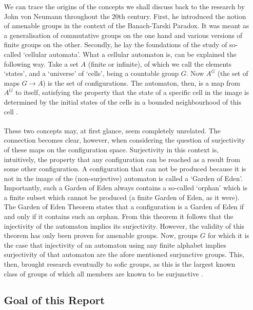 \documentclass[titlepage, a4paper]{article}
\theoremstyle{remark}
\begin{document}
We can trace the origins of the concepts we shall discuss back to the research by John von Neumann throughout the 20th century. First, he introduced the notion of amenable groups in the context of the Banach-Tarski Paradox. It was meant as a generalisation of commutative groups on the one hand and various versions of finite groups on the other. Secondly, he lay the foundations of the study of so-called ‘cellular automata’. What a cellular automaton is, can be explained the following way. Take a set $A$ (finite or infinite), of which we call the elements ‘states’, and a ‘universe’ of ‘cells’, being a countable group $G$. Now $A^G$ (the set of maps $G \to A$) is the set of configurations. The automaton, then, is a map from $A^G$ to itself, satisfying the property that the state of a specific cell in the image is determined by the initial states of the cells in a bounded neighbourhood of this cell \cite{vonNeumann_1966} .\\
\\
These two concepts may, at first glance, seem completely unrelated. The connection becomes clear, however, when considering the question of surjectivity of these maps on the configuration space. Surjectivity in this context is, intuitively, the property that any configuration can be reached as a result from some other configuration. A configuration that can not be produced because it is not in the image of the (non-surjective) automaton is called a ‘Garden of Eden’. Importantly, such a Garden of Eden always contains a so-called ‘orphan’ which is a finite subset which cannot be produced (a finite Garden of Eden, as it were). The Garden of Eden Theorem states that a configuration is a Garden of Eden if and only if it contains such an orphan. From this theorem it follows that the injectivity of the automaton implies its surjectivity. However, the validity of this theorem has only been proven for amenable groups.
Now, groups $G$ for which it is the case that injectivity of an automaton using any finite alphabet implies surjectivity of that automaton are the afore mentioned surjunctive groups. This, then, brought research eventually to sofic groups, as this is the largest known class of groups of which all members are known to be surjunctive \cite{ceccherini-silberstein_coornaert_2010}.  

\subsection*{Goal of this Report}
\end{document}
